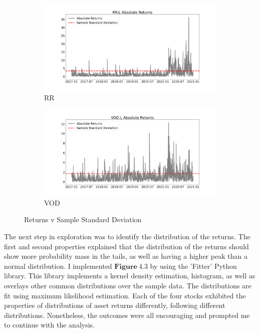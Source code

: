 \begin{figure}[hbt!]
\medskip %
\begin{subfigure}{.49\linewidth}
  \includegraphics[width=\linewidth]{images/Exploratory/plot 3.png}
  \caption{RR}
  \label{C}
\end{subfigure} %
\begin{subfigure}{.49\linewidth}
  \includegraphics[width=\linewidth]{images/Exploratory/plot 4.png}
  \caption{VOD}
  \label{D}
\end{subfigure}
\caption{Returns v Sample Standard Deviation}
\end{figure}
The next step in exploration was to identify the distribution of the returns. The first and second properties explained that the distribution of the returns should show more probability mass in the tails, as well as having a higher peak than a normal distribution. I implemented $\mathbf{Figure~4.3}$ by using the 'Fitter' Python library. This library implements a kernel density estimation, histogram, as well as overlays other common distributions over the sample data. The distributions are fit using maximum likelihood estimation. Each of the four stocks exhibited the properties of distributions of asset returns differently, following different distributions. Nonetheless, the outcomes were all encouraging and prompted me to continue with the analysis. 

